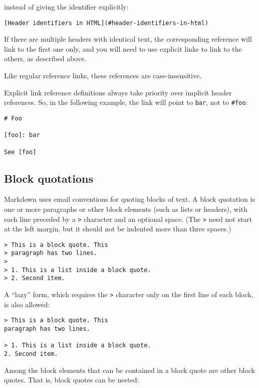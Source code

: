 \documentclass[]{article}
\begin{document}
instead of giving the identifier explicitly:

\begin{verbatim}
[Header identifiers in HTML](#header-identifiers-in-html)
\end{verbatim}

If there are multiple headers with identical text, the corresponding
reference will link to the first one only, and you will need to use
explicit links to link to the others, as described above.

Like regular reference links, these references are case-insensitive.

Explicit link reference definitions always take priority over implicit
header references. So, in the following example, the link will point to
\texttt{bar}, not to \texttt{\#foo}:

\begin{verbatim}
# Foo

[foo]: bar

See [foo]
\end{verbatim}

\subsection{Block quotations}\label{block-quotations}

Markdown uses email conventions for quoting blocks of text. A block
quotation is one or more paragraphs or other block elements (such as
lists or headers), with each line preceded by a \texttt{\textgreater{}}
character and an optional space. (The \texttt{\textgreater{}} need not
start at the left margin, but it should not be indented more than three
spaces.)

\begin{verbatim}
> This is a block quote. This
> paragraph has two lines.
>
> 1. This is a list inside a block quote.
> 2. Second item.
\end{verbatim}

A ``lazy'' form, which requires the \texttt{\textgreater{}} character
only on the first line of each block, is also allowed:

\begin{verbatim}
> This is a block quote. This
paragraph has two lines.

> 1. This is a list inside a block quote.
2. Second item.
\end{verbatim}

Among the block elements that can be contained in a block quote are
other block quotes. That is, block quotes can be nested:
\end{document}
